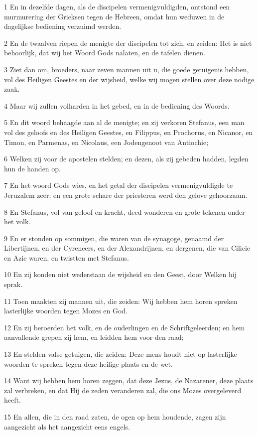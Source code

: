 \par 1 En in dezelfde dagen, als de discipelen vermenigvuldigden, ontstond een murmurering der Grieksen tegen de Hebreen, omdat hun weduwen in de dagelijkse bediening verzuimd werden.
\par 2 En de twaalven riepen de menigte der discipelen tot zich, en zeiden: Het is niet behoorlijk, dat wij het Woord Gods nalaten, en de tafelen dienen.
\par 3 Ziet dan om, broeders, naar zeven mannen uit u, die goede getuigenis hebben, vol des Heiligen Geestes en der wijsheid, welke wij mogen stellen over deze nodige zaak.
\par 4 Maar wij zullen volharden in het gebed, en in de bediening des Woords.
\par 5 En dit woord behaagde aan al de menigte; en zij verkoren Stefanus, een man vol des geloofs en des Heiligen Geestes, en Filippus, en Prochorus, en Nicanor, en Timon, en Parmenas, en Nicolaus, een Jodengenoot van Antiochie;
\par 6 Welken zij voor de apostelen stelden; en dezen, als zij gebeden hadden, legden hun de handen op.
\par 7 En het woord Gods wies, en het getal der discipelen vermenigvuldigde te Jeruzalem zeer; en een grote schare der priesteren werd den gelove gehoorzaam.
\par 8 En Stefanus, vol van geloof en kracht, deed wonderen en grote tekenen onder het volk.
\par 9 En er stonden op sommigen, die waren van de synagoge, genaamd der Libertijnen, en der Cyreneers, en der Alexandrijnen, en dergenen, die van Cilicie en Azie waren, en twistten met Stefanus.
\par 10 En zij konden niet wederstaan de wijsheid en den Geest, door Welken hij sprak.
\par 11 Toen maakten zij mannen uit, die zeiden: Wij hebben hem horen spreken lasterlijke woorden tegen Mozes en God.
\par 12 En zij beroerden het volk, en de ouderlingen en de Schriftgeleerden; en hem aanvallende grepen zij hem, en leidden hem voor den raad;
\par 13 En stelden valse getuigen, die zeiden: Deze mens houdt niet op lasterlijke woorden te spreken tegen deze heilige plaats en de wet.
\par 14 Want wij hebben hem horen zeggen, dat deze Jezus, de Nazarener, deze plaats zal verbreken, en dat Hij de zeden veranderen zal, die ons Mozes overgeleverd heeft.
\par 15 En allen, die in den raad zaten, de ogen op hem houdende, zagen zijn aangezicht als het aangezicht eens engels.

